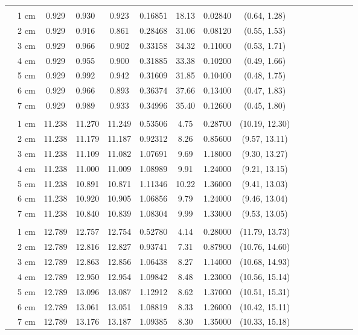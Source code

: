 \documentclass[a4paper 12pt]{article}
\numberwithin{equation}{section}
\begin{document}
{\begin{small}
\begin{table}[h!]
\begin{footnotesize}
\begin{tabular}{clclclclclclclcl}
\raisebox{1ex}{\bf age 2} &  \\ [1.0ex]
&   1 cm & 0.929 &    0.930  & 0.923 &   0.16851& 18.13 & 0.02840 & (0.64, 1.28)\\
&   2 cm & 0.929 &    0.916  & 0.861 &   0.28468& 31.06 & 0.08120 & (0.55, 1.53) \\
&   3 cm & 0.929 &    0.966  & 0.902 &   0.33158& 34.32 & 0.11000 & (0.53, 1.71)\\
&   4 cm & 0.929 &    0.955  & 0.900 &   0.31885& 33.38 & 0.10200 & (0.49, 1.66)\\
&   5 cm & 0.929 &    0.992  & 0.942 &   0.31609& 31.85 & 0.10400 & (0.48, 1.75)\\
&   6 cm & 0.929 &    0.966  & 0.893 &   0.36374& 37.66 & 0.13400 & (0.47, 1.83)\\
&   7 cm & 0.929 &    0.989  & 0.933 &   0.34996& 35.40 & 0.12600 & (0.45, 1.80)\\[1.2ex]

 \raisebox{1ex}{\bf age 3} \\ [1.0ex]
&   1 cm & 11.238  &  11.270 & 11.249 &  0.53506& 4.75  & 0.28700 & (10.19, 12.30)\\
&   2 cm & 11.238  &  11.179 & 11.187 &  0.92312& 8.26  & 0.85600 & (9.57, 13.11)\\
&   3 cm & 11.238  &  11.109 & 11.082 &  1.07691& 9.69  & 1.18000 & (9.30, 13.27)\\
&   4 cm & 11.238  &  11.000 & 11.009 &  1.08989& 9.91  & 1.24000 & (9.21, 13.15)\\
&   5 cm & 11.238  &  10.891 & 10.871 &  1.11346& 10.22 & 1.36000 & (9.41, 13.03)\\
&   6 cm & 11.238  &  10.920 & 10.905 &  1.06856& 9.79  & 1.24000 & (9.46, 13.04)\\
&   7 cm & 11.238  &  10.840 & 10.839 &  1.08304& 9.99  & 1.33000 & (9.53, 13.05)\\[1.5ex]

 \raisebox{1ex}{\bf age 4} &  \\ [1.0ex]
 &  1 cm & 12.789 &   12.757 & 12.754 &  0.52780& 4.14 & 0.28000 & (11.79, 13.73) \\
 &  2 cm & 12.789 &   12.816 & 12.827 &  0.93741& 7.31 & 0.87900 & (10.76, 14.60) \\
 &  3 cm & 12.789 &   12.863 & 12.856 &  1.06438& 8.27 & 1.14000 & (10.68, 14.93) \\
 &  4 cm & 12.789 &   12.950 & 12.954 &  1.09842& 8.48 & 1.23000 & (10.56, 15.14) \\
 &  5 cm & 12.789 &   13.096 & 13.087 &  1.12912& 8.62 & 1.37000 & (10.51, 15.31) \\
 &  6 cm & 12.789 &   13.061 & 13.051 &  1.08819& 8.33 & 1.26000 & (10.42, 15.11) \\
 &  7 cm & 12.789 &   13.176 & 13.187 &  1.09385& 8.30 & 1.35000 & (10.33, 15.18) \\[1.2ex]


\end{tabular}
\end{footnotesize}
\end{table}
\end{small}}
\end{document}
